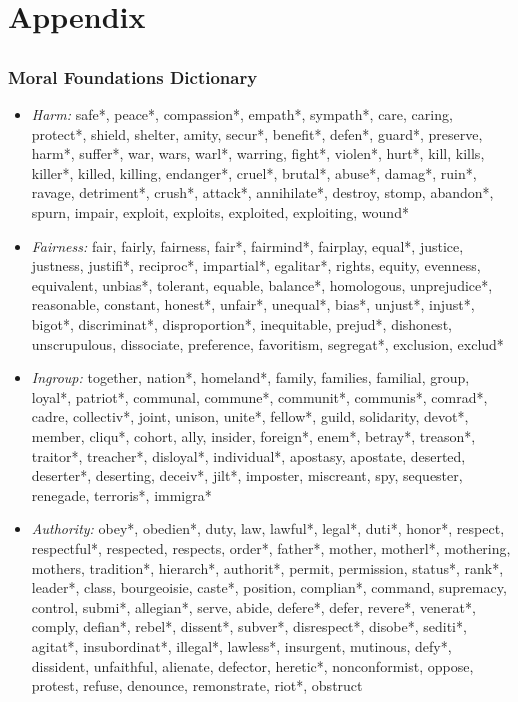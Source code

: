 \documentclass{beamer}
\begin{document}
\section{Appendix}
\subsection{}
\begin{frame}%
  \frametitle{Moral Foundations Dictionary \citep[c.f.][]{graham2009liberals}}
  \begin{tiny}
    \begin{itemize}
      \item \emph{Harm:} safe*, peace*, compassion*, empath*, sympath*, care, caring, protect*, shield, shelter, amity, secur*, benefit*, defen*, guard*, preserve, harm*, suffer*, war, wars, warl*, warring, fight*, violen*, hurt*, kill, kills, killer*, killed, killing, endanger*, cruel*, brutal*, abuse*, damag*, ruin*, ravage, detriment*, crush*, attack*, annihilate*, destroy, stomp, abandon*, spurn, impair, exploit, exploits, exploited, exploiting, wound*

      \item \emph{Fairness:} fair, fairly, fairness, fair*, fairmind*, fairplay, equal*, justice, justness, justifi*, reciproc*, impartial*, egalitar*, rights, equity, evenness, equivalent, unbias*, tolerant, equable, balance*, homologous, unprejudice*, reasonable, constant, honest*, unfair*, unequal*, bias*, unjust*, injust*, bigot*, discriminat*, disproportion*, inequitable, prejud*, dishonest, unscrupulous, dissociate, preference, favoritism, segregat*, exclusion, exclud*

      \item \emph{Ingroup:} together, nation*, homeland*, family, families, familial, group, loyal*, patriot*, communal, commune*, communit*, communis*, comrad*, cadre, collectiv*, joint, unison, unite*, fellow*, guild, solidarity, devot*, member, cliqu*, cohort, ally, insider, foreign*, enem*, betray*, treason*, traitor*, treacher*, disloyal*, individual*, apostasy, apostate, deserted, deserter*, deserting, deceiv*, jilt*, imposter, miscreant, spy, sequester, renegade, terroris*, immigra*

      \item \emph{Authority:} obey*, obedien*, duty, law, lawful*, legal*, duti*, honor*, respect, respectful*, respected, respects, order*, father*, mother, motherl*, mothering, mothers, tradition*, hierarch*, authorit*, permit, permission, status*, rank*, leader*, class, bourgeoisie, caste*, position, complian*, command, supremacy, control, submi*, allegian*, serve, abide, defere*, defer, revere*, venerat*, comply, defian*, rebel*, dissent*, subver*, disrespect*, disobe*, sediti*, agitat*, insubordinat*, illegal*, lawless*, insurgent, mutinous, defy*, dissident, unfaithful, alienate, defector, heretic*, nonconformist, oppose, protest, refuse, denounce, remonstrate, riot*, obstruct


\end{itemize}
\end{tiny}
\end{frame}
\end{document}
